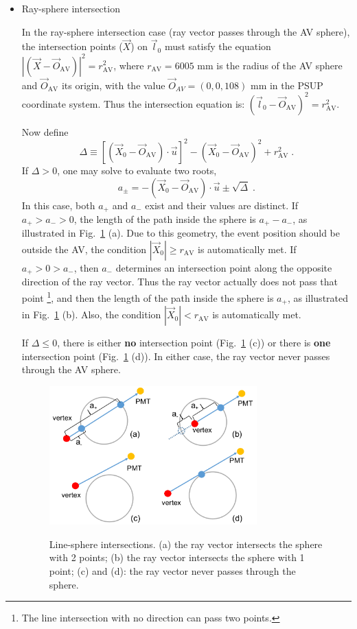 \begin{itemize}
\item Ray-sphere intersection

In the ray-sphere intersection case (ray vector passes through the AV sphere), the intersection points ($\vec{X}$) on $\vec{l}_0$ must satisfy the equation $|(\vec{X}-\vec{O}_\mathrm{AV})|^2= r^2_\mathrm{AV}$, where $r_\mathrm{AV}=6005$ mm is the radius of the AV sphere and $\vec{O}_\mathrm{AV}$ its origin, with the value $\vec{O}_{AV} = (0,0,108)$ mm in the PSUP coordinate system. Thus the intersection equation is:
$(\vec{l}_0-\vec{O}_\mathrm{AV})^2 = r^2_\mathrm{AV}$.

Now define 
\begin{equation}
\Delta \equiv {[(\vec{X}_0-\vec{O}_\mathrm{AV})\cdot\vec{u}]}^2-{(\vec{X}_0-\vec{O}_\mathrm{AV})}^2+r^2_\mathrm{AV} \; .
\end{equation}
If $\Delta>0$, one may solve to evaluate two roots,
\begin{equation}\label{eq:ray-sphere}
a_{\pm} = -(\vec{X}_0-\vec{O}_\mathrm{AV})\cdot\vec{u}\pm\sqrt{\Delta} \;.
\end{equation}
In this case, both $a_+$ and $a_-$ exist and their values are distinct. If $a_{+} > a_{-} > 0$, the length of the path inside the sphere is $a_{+} - a_{-} $, as illustrated in Fig.~\ref{line-sphere} (a). Due to this geometry, the event position should be outside the AV, the condition $|\vec{X}_0|\geq r_\mathrm{AV}$ is automatically met. If $a_{+} > 0 >a_{-}$, then $a_{-}$ determines an intersection point along the opposite direction of the ray vector. Thus the ray vector actually does not pass that point \footnote{The line intersection with no direction can pass two points.}, and then the length of the path inside the sphere is $a_{+}$, as illustrated in Fig.~\ref{line-sphere} (b). Also, the condition $|\vec{X}_0| < r_\mathrm{AV}$ is automatically met. 

If $\Delta\leq 0$, there is either {\bf no} intersection point (Fig.~\ref{line-sphere} (c)) or there is {\bf one} intersection point (Fig.~\ref{line-sphere} (d)). In either case, the ray vector never passes through the AV sphere.

\begin{figure}
	\centering
{\includegraphics[width=80mm]{line-sphere.png}}
\caption[Line-sphere intersections.]{Line-sphere intersections. (a) the ray vector intersects the sphere with 2 points; (b) the ray vector intersects the sphere with 1 point; (c) and (d): the ray vector never passes through the sphere.}\label{line-sphere}
\end{figure}


\end{itemize}
